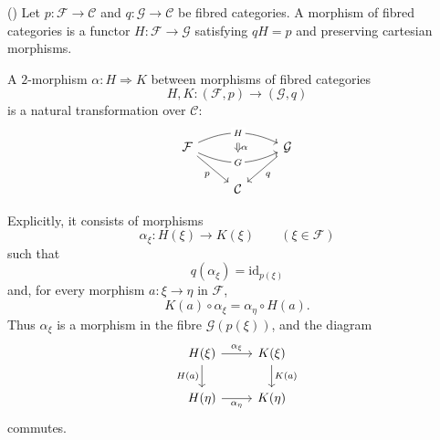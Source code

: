 \begin{definition}
	\label{def:morphism-fibred-categories}
	(\cite[][Tag 02XP]{stacks-project})
	Let $p:\mathcal{F}\to\mathcal{C}$ and
	$q:\mathcal{G}\to\mathcal{C}$ be fibred categories.
	A morphism of fibred categories is a functor $H:\mathcal{F} \to \mathcal{G}$ satisfying $qH=p$ and preserving cartesian
	morphisms.
	
	A $2$-morphism $\alpha:H\Rightarrow K$ between
	morphisms of fibred categories
	\[
	H,K:(\mathcal F,p)\longrightarrow(\mathcal G,q)
	\]
	is a natural transformation over $\mathcal C$:
	\[
	\begin{tikzcd}
		\mathcal{F} && \mathcal{G} \\
		& \mathcal{C}
		\arrow[
		""{name=Hmid, anchor=center, inner sep=0},
		"H"{description},
		bend left=25,
		from=1-1, to=1-3
		]
		\arrow[
		""{name=Gmid, anchor=center, inner sep=0},
		"G"{description},
		bend right=25,
		from=1-1, to=1-3
		]
		\arrow["p"', from=1-1, to=2-2]
		\arrow["q",  from=1-3, to=2-2]
		\arrow[
		phantom,
		""{name=alphaStart, pos=0.3, anchor=center, inner sep=0},
		""{name=alphaEnd,   pos=0.7, anchor=center, inner sep=0},
		from=Hmid, to=Gmid
		]
		\arrow[
		"\alpha",
		Rightarrow,
		from=alphaStart, to=alphaEnd
		]
	\end{tikzcd}
	\]
	
	Explicitly, it consists of morphisms
	\[
	\alpha_\xi:H(\xi)\longrightarrow K(\xi)
	\qquad (\xi\in\mathcal F)
	\]
	such that
	\[
	q(\alpha_\xi)=\mathrm{id}_{p(\xi)}
	\]
	and, for every morphism $a:\xi\to\eta$ in $\mathcal F$,
	\[
	K(a)\circ\alpha_\xi
	=
	\alpha_\eta\circ H(a).
	\]
	Thus $\alpha_\xi$ is a morphism in the fibre
	$\mathcal G(p(\xi))$, and the diagram
	\[
	\begin{tikzcd}
		H(\xi) \arrow[r,"\alpha_\xi"] \arrow[d,"H(a)"']
		& K(\xi) \arrow[d,"K(a)"] \\
		H(\eta) \arrow[r,"\alpha_\eta"']
		& K(\eta)
	\end{tikzcd}
	\]
	commutes.
\end{definition}

